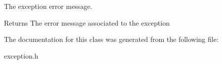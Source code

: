 The exception error message. 

\begin{DoxyReturn}{Returns}
The error message associated to the exception 
\end{DoxyReturn}


The documentation for this class was generated from the following file\-:\begin{DoxyCompactItemize}
\item 
exception.\-h\end{DoxyCompactItemize}
